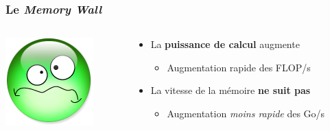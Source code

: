 \documentclass[xcolor={x11names,svgnames}]{beamer}
\begin{document}
\begin{frame}
  \frametitle{Le \og \emph{Memory Wall}\fg{}}

    \begin{columns}[c]
    \begin{column}{.1\textwidth}
      \includegraphics[width=\textwidth]{triste.png}
    \end{column}
    \begin{column}{.9\textwidth}
      
  \begin{itemize}
  \item La \textbf{puissance de calcul} augmente
    \begin{itemize}
    \item Augmentation rapide des FLOP/s
    \end{itemize}

    \medskip
    
  \item La vitesse de la mémoire \textbf{ne suit pas}
        \begin{itemize}
    \item Augmentation \emph{moins rapide} des Go/s
    \end{itemize}
  \end{itemize}
\end{column}
\end{columns}


\end{frame}
\end{document}
